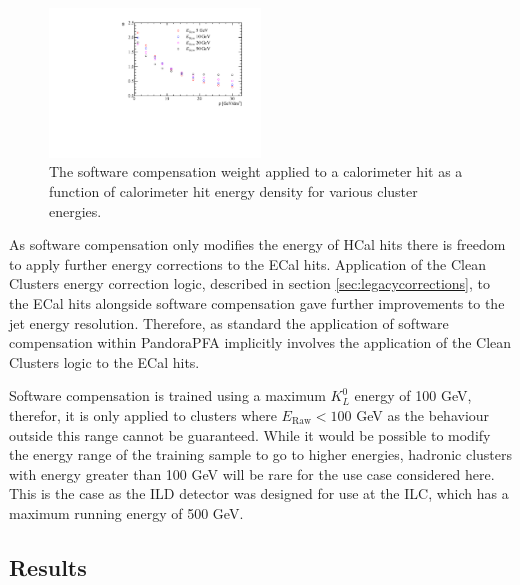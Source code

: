 \begin{figure}
\includegraphics[width=0.5\textwidth]{EnergyEstimators/Plots/SoftComp/Weights/SoftwareCompensationWeights.pdf}
\caption[The software compensation weight applied to a calorimeter hit as a function of calorimeter hit energy density for various cluster energies.]{The software compensation weight applied to a calorimeter hit as a function of calorimeter hit energy density for various cluster energies.}
\label{fig:softcompweights}
\end{figure}

As software compensation only modifies the energy of HCal \text{ } hits there is freedom to apply further energy corrections to the ECal \text{ } hits.  Application of the Clean Clusters energy correction logic, described in section \ref{sec:legacycorrections}, to the ECal \text{ } hits alongside software compensation gave further improvements to the jet energy resolution.  Therefore, as standard the application of software compensation within PandoraPFA implicitly involves the application of the Clean Clusters logic to the ECal \text{ } hits.  

Software compensation is trained using a maximum $K^{0}_{L}$ energy of 100 GeV, therefor, it is only applied to clusters where $E_{\text{Raw}} < 100$ GeV as the behaviour outside this range cannot be guaranteed.  While it would be possible to modify the energy range of the training sample to go to higher energies, hadronic clusters with energy greater than 100 GeV will be rare for the use case considered here.  This is the case as the ILD detector was designed for use at the ILC, which has a maximum running energy of 500 GeV.  


\subsection{Results}


